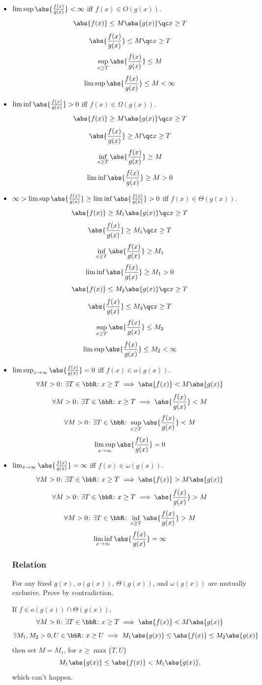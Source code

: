 \documentclass[a4paper,12pt]{report}
\begin{document}
\begin{itemize}
\begin{itemize}
\subsubsection{Limit}
If $\exists k\in\bbR\colon x\ge k\implies g(x)\ne0$,
\bit
\item $\limsup\abs{\frac{f(x)}{g(x)}}<\infty$ iff $f(x)\in O(g(x))$.
\bpr
\[\abs{f(x)}\le M\abs{g(x)}\qc x\ge T\]
\[\abs{\frac{f(x)}{g(x)}}\le M\qc x\ge T\]
\[\sup_{x\ge T}\abs{\frac{f(x)}{g(x)}}\le M\]
\[\limsup\abs{\frac{f(x)}{g(x)}}\le M<\infty\]
\epr
\item $\liminf\abs{\frac{f(x)}{g(x)}}>0$ iff $f(x)\in \Omega(g(x))$.
\bpr
\[\abs{f(x)}\ge M\abs{g(x)}\qc x\ge T\]
\[\abs{\frac{f(x)}{g(x)}}\ge M\qc x\ge T\]
\[\inf_{x\ge T}\abs{\frac{f(x)}{g(x)}}\ge M\]
\[\liminf\abs{\frac{f(x)}{g(x)}}\ge M>0\]
\epr
\item $\infty>\limsup\abs{\frac{f(x)}{g(x)}}\ge\liminf\abs{\frac{f(x)}{g(x)}}>0$ iff $f(x)\in \Theta(g(x))$.
\bpr
\[\abs{f(x)}\ge M_1\abs{g(x)}\qc x\ge T\]
\[\abs{\frac{f(x)}{g(x)}}\ge M_1\qc x\ge T\]
\[\inf_{x\ge T}\abs{\frac{f(x)}{g(x)}}\ge M_1\]
\[\liminf\abs{\frac{f(x)}{g(x)}}\ge M_1>0\]
\[\abs{f(x)}\le M_2\abs{g(x)}\qc x\ge T\]
\[\abs{\frac{f(x)}{g(x)}}\le M_2\qc x\ge T\]
\[\sup_{x\ge T}\abs{\frac{f(x)}{g(x)}}\le M_2\]
\[\limsup\abs{\frac{f(x)}{g(x)}}\le M_2<\infty\]
\epr
\item $\limsup_{x\to\infty}\abs{\frac{f(x)}{g(x)}}=0$ iff $f(x)\in o(g(x))$.
\[\forall M>0\colon\exists T\in\bbR\colon x\ge T\implies\abs{f(x)}<M\abs{g(x)}\]
\[\forall M>0\colon\exists T\in\bbR\colon x\ge T\implies\abs{\frac{f(x)}{g(x)}}<M\]
\[\forall M>0\colon\exists T\in\bbR\colon\sup_{x\ge T}\abs{\frac{f(x)}{g(x)}}<M\]
\[\limsup_{x\to\infty}\abs{\frac{f(x)}{g(x)}}=0\]
\item $\lim_{x\to\infty}\abs{\frac{f(x)}{g(x)}}=\infty$ iff $f(x)\in \omega(g(x))$.
\[\forall M>0\colon\exists T\in\bbR\colon x\ge T\implies\abs{f(x)}>M\abs{g(x)}\]
\[\forall M>0\colon\exists T\in\bbR\colon x\ge T\implies\abs{\frac{f(x)}{g(x)}}>M\]
\[\forall M>0\colon\exists T\in\bbR\colon\inf_{x\ge T}\abs{\frac{f(x)}{g(x)}}>M\]
\[\liminf_{x\to\infty}\abs{\frac{f(x)}{g(x)}}=\infty\]
\eit
\subsubsection{Relation}
For any fixed $g(x)$, $o(g(x))$, $\Theta(g(x))$, and $\omega(g(x))$ are mutually exclusive.
\bpr
Prove by contradiction.

If $f\in o(g(x))\cap\Theta(g(x))$,
\[\forall M>0\colon\exists T\in\bbR\colon x\ge T\implies\abs{f(x)}<M\abs{g(x)}\]
\[\exists M_1,M_2>0,U\in\bbR\colon x\ge U\implies M_1\abs{g(x)}\le\abs{f(x)}\le M_2\abs{g(x)}\]
then set $M=M_1$, for $x\ge\max\{T,U\}$
\[M_1\abs{g(x)}\le\abs{f(x)}<M_1\abs{g(x)},\]
which can't happen.


\end{itemize}
\end{itemize}
\end{document}
